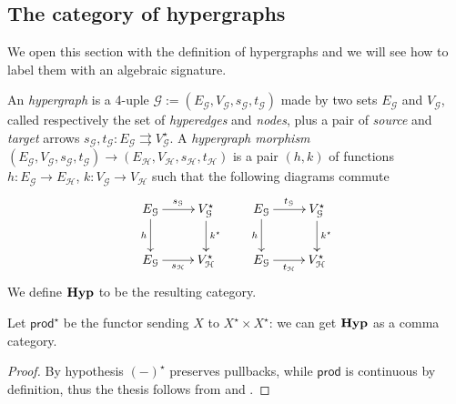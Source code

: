 \documentclass[a4paper,UKenglish,cleveref,pdftex,thm-restate,numberwithinsect]{lipics-v2021}
\newcommand{\Set}{\mathbf{Set}}
\def\X{\textbf {\textup{X}}}
\newcommand{\catname}[1]{\textbf{\textup{#1}}}
\newcommand{\hyp}{\catname{Hyp}}
\newcommand{\pro}{\mathsf{prod}}
\newcommand{\comma}[2]{#1\hspace{1pt} {\downarrow}#2}
\newcommand{\id}[1]{\mathsf{id}_{#1}}
\begin{document}

\subsection{The category of hypergraphs}

We open this section with the definition of hypergraphs and we will see how to label them with an algebraic signature.  


\begin{definition}An \emph{hypergraph} is a 4-uple $\mathcal{G}:=(E_\mathcal{G}, V_\mathcal{G}, s_\mathcal{G}, t_\mathcal{G})$ made by two sets $E_\mathcal{G}$ and $V_\mathcal{G}$, called respectively the set of \emph{hyperedges} and \emph{nodes}, plus a pair of \emph{source} and \emph{target} arrows  $s_\mathcal{G}, t_\mathcal{G}\colon E_\mathcal{G}\rightrightarrows V_\mathcal{G}^\star$. A \emph{hypergraph morphism} $(E_\mathcal{G}, V_\mathcal{G}, s_\mathcal{G}, t_\mathcal{G})\to (E_\mathcal{H}, V_\mathcal{H}, s_\mathcal{H}, t_\mathcal{H})$ is a pair $(h,k)$ of functions $h\colon E_\mathcal{G}\to E_\mathcal{H}$, $k\colon V_\mathcal{G}\to V_\mathcal{H}$ such that the following diagrams commute
	\[\xymatrix{ E_{\mathcal{G}} \ar[d]_{h} \ar[r]^{s_{\mathcal{G}}}& V^\star_{\mathcal{G}}  \ar[d]^{k^\star}& E_{\mathcal{G}} \ar[r]^{t_{\mathcal{G}}} \ar[d]_{h} & V^\star_{\mathcal{G}} \ar[d]^{k^\star}  \\ E_{\mathcal{G}} \ar[r]_{s_{\mathcal{H}}} & V^\star_{\mathcal{H}} & E_{\mathcal{G}} \ar[r]_{t_{\mathcal{H}}} & V^\star_{\mathcal{H}} }\]
	We define $\hyp$ to be the resulting category.
\end{definition}

Let $\pro^\star$ be the functor sending $X$ to $X^\star\times X^\star$: we can get $\hyp$ as a comma category.


\begin{proof}
	By hypothesis $(-)^\star$ preserves pullbacks, while $\pro$ is continuous by definition, thus the thesis follows from   and .   
\end{proof}
\end{document}
